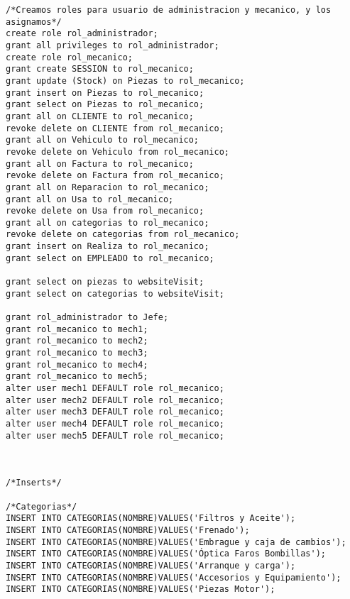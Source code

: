 \begin{lstlisting}[caption=Script .sql para crear la BD (BBDD)]
/*Creamos roles para usuario de administracion y mecanico, y los asignamos*/
create role rol_administrador;
grant all privileges to rol_administrador;
create role rol_mecanico;
grant create SESSION to rol_mecanico;
grant update (Stock) on Piezas to rol_mecanico;
grant insert on Piezas to rol_mecanico;
grant select on Piezas to rol_mecanico;
grant all on CLIENTE to rol_mecanico;
revoke delete on CLIENTE from rol_mecanico;
grant all on Vehiculo to rol_mecanico;
revoke delete on Vehiculo from rol_mecanico;
grant all on Factura to rol_mecanico;
revoke delete on Factura from rol_mecanico;
grant all on Reparacion to rol_mecanico;
grant all on Usa to rol_mecanico;
revoke delete on Usa from rol_mecanico;
grant all on categorias to rol_mecanico;
revoke delete on categorias from rol_mecanico;
grant insert on Realiza to rol_mecanico;
grant select on EMPLEADO to rol_mecanico;

grant select on piezas to websiteVisit;
grant select on categorias to websiteVisit;

grant rol_administrador to Jefe;
grant rol_mecanico to mech1;
grant rol_mecanico to mech2;
grant rol_mecanico to mech3;
grant rol_mecanico to mech4;
grant rol_mecanico to mech5;
alter user mech1 DEFAULT role rol_mecanico;
alter user mech2 DEFAULT role rol_mecanico;
alter user mech3 DEFAULT role rol_mecanico;
alter user mech4 DEFAULT role rol_mecanico;
alter user mech5 DEFAULT role rol_mecanico;



/*Inserts*/

/*Categorias*/
INSERT INTO CATEGORIAS(NOMBRE)VALUES('Filtros y Aceite');
INSERT INTO CATEGORIAS(NOMBRE)VALUES('Frenado');
INSERT INTO CATEGORIAS(NOMBRE)VALUES('Embrague y caja de cambios');
INSERT INTO CATEGORIAS(NOMBRE)VALUES('Óptica Faros Bombillas');
INSERT INTO CATEGORIAS(NOMBRE)VALUES('Arranque y carga');
INSERT INTO CATEGORIAS(NOMBRE)VALUES('Accesorios y Equipamiento');
INSERT INTO CATEGORIAS(NOMBRE)VALUES('Piezas Motor');




\end{lstlisting}
